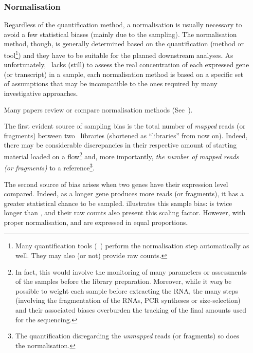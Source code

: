 \subsubsection{Normalisation}\label{subsub:norm}
Regardless of the quantification method, a normalisation is usually
necessary to avoid a few statistical biases (mainly due to the sampling). The
normalisation method, though, is generally determined based on the quantification
(method or tool\footnote{Many quantification tools (\eg\ \cuffl) perform
the normalisation step automatically as well. They may also (or not) provide
raw counts.}) and they have to be suitable for the planned downstream analyses.
As unfortunately, \Rnaseq\ lacks (still) to assess the real concentration of each
expressed gene (or transcript) in a sample, each normalisation method is based on
a specific set of assumptions that may be incompatible to the ones required by
many investigative approaches.

Many papers review or compare normalisation methods (See~\citet{Dillies2013,%
normSigCancerHelp,NormImpact,ruvseqComQN}).

The first evident source of sampling bias is the total number of \emph{mapped}
reads (or fragments) between two \Rnaseq\ libraries (shortened as
\enquote{libraries} from now on). Indeed, there may be considerable discrepancies in
their respective amount of starting material loaded on a
\gls{flow}\footnote{In fact, this would involve the monitoring of many parameters
or assessments of the samples before the library preparation. Moreover, while
it \emph{may} be possible to weight each sample before extracting the \gls{RNA},
the many steps (involving the fragmentation of the \glspl{RNA},
\gls{PCR} syntheses or size-selection) and their associated biases
overburden the tracking of the final amounts used for the sequencing.}
and, more importantly, \emph{the number of mapped reads (or
fragments)} to a reference\footnote{The quantification disregarding the
\emph{unmapped} reads (or fragments) so does the normalisation.}.

The second source of bias arises when two genes have their expression level
compared. Indeed, as a longer gene produces more reads (or fragments), it has a
greater statistical chance to be sampled.  illustrates
this sample bias:  is twice longer than , and their
raw counts also present this scaling factor. However, with proper normalisation,
 and  are expressed in equal proportions.

